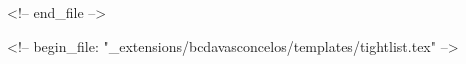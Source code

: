 <!-- end_file -->
  
<!-- begin_file: "_extensions/bcdavasconcelos/templates/tightlist.tex" -->
\providecommand{\tightlist}{%
  \setlength{\itemsep}{0pt}\setlength{\parskip}{0pt}}